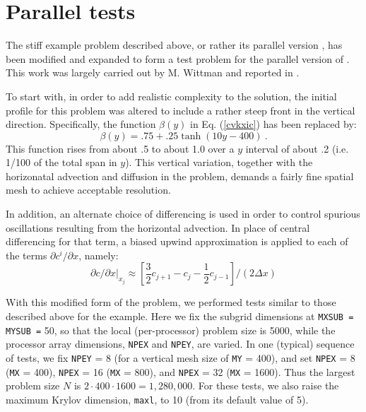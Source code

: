 \section{Parallel tests}\label{s:ex_tests}

The stiff example problem  described above, or rather its parallel
version , has been modified and expanded to form a test problem for
the parallel version of {\cvode}.  This work was largely carried out
by M. Wittman and reported in \cite{Wit:96}.

To start with, in order to add realistic complexity to the solution, the
initial profile for this problem was altered to include a rather steep front
in the vertical direction. Specifically, the function $\beta(y)$ in
Eq. (\ref{cvkxic}) has been replaced by: 
\begin{equation}
\beta(y) = .75 + .25 \tanh(10 y - 400) ~.
\end{equation}
This function rises from about .5 to about 1.0 over a $y$ interval of about
.2 (i.e. 1/100 of the total span in $y$). This vertical variation, together
with the horizonatal advection and diffusion in the problem, demands a
fairly fine spatial mesh to achieve acceptable resolution.

In addition, an alternate choice of differencing is used in order to control
spurious oscillations resulting from the horizontal advection. In place of
central differencing for that term, a biased upwind approximation is applied
to each of the terms $\partial c^i/\partial x$, namely: 
\begin{equation}
\left. \partial c/\partial x\right| _{x_j}\approx \left[ \frac
32c_{j+1}-c_j-\frac 12c_{j-1}\right] /(2\Delta x)
\end{equation}

With this modified form of the problem, we performed tests similar to those
described above for the example. Here we fix the subgrid dimensions at
{\tt MXSUB = MYSUB =} 50, so that the local (per-processor) problem size is 5000,
while the processor array dimensions, {\tt NPEX} and {\tt NPEY}, are varied.
In one (typical) sequence of tests, we fix {\tt NPEY} = 8 (for a vertical
mesh size of {\tt MY} = 400), and set {\tt NPEX} = 8 ({\tt MX} = 400),
{\tt NPEX} = 16 ({\tt MX} = 800), and {\tt NPEX} = 32 ({\tt MX} = 1600). 
Thus the largest problem size $N$ is $2 \cdot 400 \cdot 1600 = 1,280,000$. 
For these tests, we also raise the maximum Krylov dimension, {\tt maxl},
to 10 (from its default value of 5).

